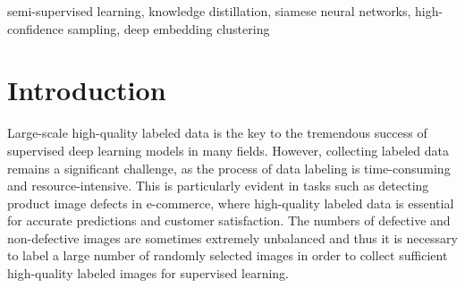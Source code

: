 \documentclass{article}
\begin{document}
%
\begin{keywords}
semi-supervised learning, knowledge distillation, siamese neural networks, high-confidence sampling, deep embedding clustering
\end{keywords}
%
\section{Introduction}
\label{sec:intro}

Large-scale high-quality labeled data is the key to the tremendous success of supervised deep learning models in many fields.
However, collecting labeled data remains a significant challenge, as the process of data labeling is time-consuming and resource-intensive.
This is particularly evident in tasks such as detecting product image defects in e-commerce, where high-quality labeled data is essential for accurate predictions and customer satisfaction.
The numbers of defective and non-defective images are sometimes extremely unbalanced and thus
it is necessary to label a large number of randomly selected images in order to collect sufficient high-quality labeled images for supervised learning.

\end{document}
